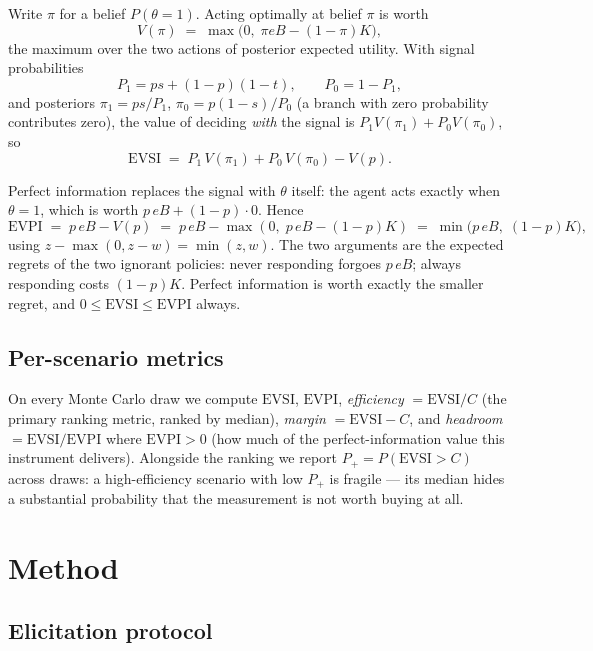 \documentclass[11pt]{article}
\newcommand{\evsi}{\mathrm{EVSI}}
\newcommand{\evpi}{\mathrm{EVPI}}
\begin{document}
Write $\pi$ for a belief $P(\theta{=}1)$. Acting optimally at belief $\pi$ is
worth
\[
V(\pi) \;=\; \max\bigl(0,\; \pi e B - (1-\pi) K\bigr),
\]
the maximum over the two actions of posterior expected utility. With signal
probabilities
\[
P_1 = p s + (1-p)(1-t), \qquad P_0 = 1 - P_1,
\]
and posteriors $\pi_1 = p s / P_1$, $\pi_0 = p(1-s)/P_0$ (a branch with zero
probability contributes zero), the value of deciding \emph{with} the signal is
$P_1 V(\pi_1) + P_0 V(\pi_0)$, so
\[
\evsi \;=\; P_1\,V(\pi_1) + P_0\,V(\pi_0) - V(p).
\]

Perfect information replaces the signal with $\theta$ itself: the agent acts
exactly when $\theta = 1$, which is worth $p\,e B + (1-p)\cdot 0$. Hence
\[
\evpi \;=\; p\,eB - V(p)
\;=\; p\,eB - \max(0,\; p\,eB - (1-p)K)
\;=\; \min\bigl(p\,eB,\; (1-p)K\bigr),
\]
using $z - \max(0, z - w) = \min(z, w)$. The two arguments are the expected
regrets of the two ignorant policies: never responding forgoes $p\,eB$;
always responding costs $(1-p)K$. Perfect information is worth exactly the
smaller regret, and $0 \le \evsi \le \evpi$ always.

\subsection{Per-scenario metrics}

On every Monte Carlo draw we compute $\evsi$, $\evpi$, \emph{efficiency}
$= \evsi / C$ (the primary ranking metric, ranked by median), \emph{margin}
$= \evsi - C$, and \emph{headroom} $= \evsi/\evpi$ where $\evpi > 0$ (how much
of the perfect-information value this instrument delivers). Alongside the
ranking we report $P_+ = P(\evsi > C)$ across draws: a high-efficiency
scenario with low $P_+$ is fragile --- its median hides a substantial
probability that the measurement is not worth buying at all.

\section{Method}
\label{sec:method}

\subsection{Elicitation protocol}
\end{document}
